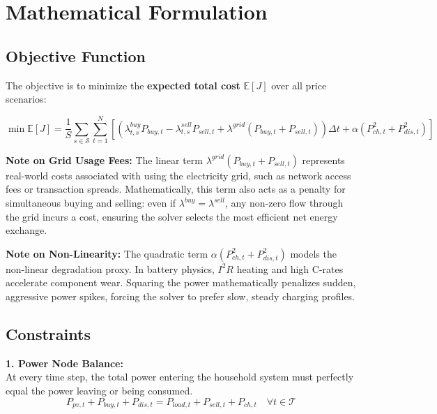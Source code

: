 \documentclass[12pt, a4paper]{article}
\begin{document}
\section{Mathematical Formulation}

\subsection{Objective Function}
The objective is to minimize the \textbf{expected total cost} $\mathbb{E}[J]$ over all price scenarios:

\begin{equation}
    \min \mathbb{E}[J] = \frac{1}{S} \sum_{s \in \mathcal{S}} \sum_{t=1}^{N} \left[ \left( \lambda^{buy}_{t,s} P_{buy,t} - \lambda^{sell}_{t,s} P_{sell,t} + \lambda^{grid} (P_{buy,t} + P_{sell,t}) \right) \Delta t + \alpha \left( P_{ch,t}^2 + P_{dis,t}^2 \right) \right]
\end{equation}

\vspace{0.5cm}
\noindent \textbf{Note on Grid Usage Fees:} The linear term $\lambda^{grid}(P_{buy,t} + P_{sell,t})$ represents real-world costs associated with using the electricity grid, such as network access fees or transaction spreads. Mathematically, this term also acts as a penalty for simultaneous buying and selling: even if $\lambda^{buy} = \lambda^{sell}$, any non-zero flow through the grid incurs a cost, ensuring the solver selects the most efficient net energy exchange.

\noindent \textbf{Note on Non-Linearity:} The quadratic term $\alpha(P_{ch,t}^2 + P_{dis,t}^2)$ models the non-linear degradation proxy. In battery physics, $I^2R$ heating and high C-rates accelerate component wear. Squaring the power mathematically penalizes sudden, aggressive power spikes, forcing the solver to prefer slow, steady charging profiles.

\subsection{Constraints}

\noindent \textbf{1. Power Node Balance:} \\
At every time step, the total power entering the household system must perfectly equal the power leaving or being consumed.
\begin{equation}
    P_{pv,t} + P_{buy,t} + P_{dis,t} = P_{load,t} + P_{sell,t} + P_{ch,t} \quad \forall t \in \mathcal{T}
\end{equation}
\end{document}
